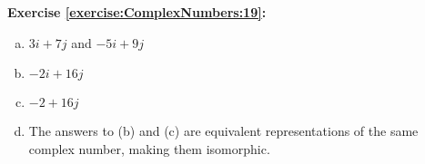 \noindent\textbf{Exercise \ref{exercise:ComplexNumbers:19}:} %
\begin{enumerate}[(a)]
\item
$3i + 7j$ and $-5i + 9j$

\item
$-2i + 16j$

\item
$-2 + 16j$

\item
The answers to (b) and (c) are equivalent representations of the same complex number, making them isomorphic.
\end{enumerate}

